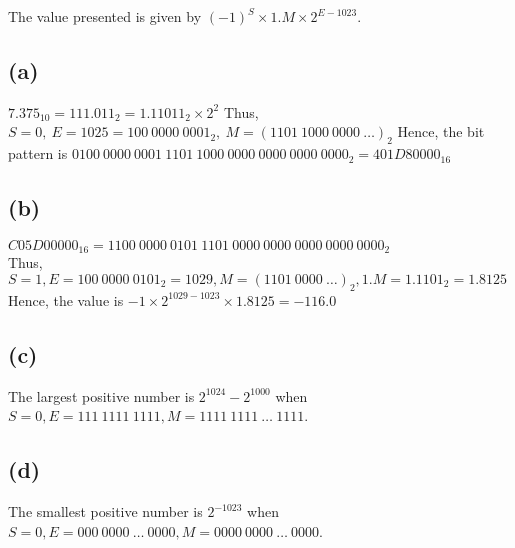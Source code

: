 The value presented is given by $(-1)^{S} \times 1.M \times 2^{E-1023}$.


\subsection*{(a)}
$7.375_{10} = 111.011_{2} = 1.11011_{2} \times 2^{2}$
Thus, $S = 0,\ E = 1025 = 100\ 0000\ 0001_{2},\ M = (1101\ 1000\ 0000\ \dots)_{2}$
Hence, the bit pattern is $0100\ 0000\ 0001\ 1101\ 1000\ 0000\ 0000\ 0000\ 0000_{2} = 401D80000_{16}$

\subsection*{(b)}
$C05D00000_{16} = 1100\ 0000\ 0101\ 1101\ 0000\ 0000\ 0000\ 0000\ 0000_{2}$ \\
Thus, $S = 1, E = 100\ 0000\ 0101_{2} = 1029, M = (1101\ 0000\ \dots)_{2}, 1.M = 1.1101_{2} = 1.8125$ \\
Hence, the value is $-1 \times 2^{1029 - 1023} \times 1.8125 = -116.0$

\subsection*{(c)}
The largest positive number is $2^{1024} - 2^{1000}$ when $S = 0, E = 111\ 1111\ 1111, M = 1111\ 1111\ \dots\ 1111$.

\subsection*{(d)}
The smallest positive number is $2^{-1023}$ when $S = 0, E = 000\ 0000\ \dots\ 0000, M = 0000\ 0000\ \dots\ 0000$.

